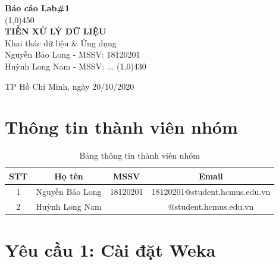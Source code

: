 \documentclass[a4paper, 12pt]{article}
\begin{document}
\begin{titlepage}
    \begin{center}
        \vspace*{1cm}
        \Large\textbf{Báo cáo Lab\#1}\\

        \vfill
        \line(1,0){450}\\[4mm]
        \LARGE\textbf{\MakeUppercase{Tiền xử lý dữ liệu}}\\[3mm]
        \Large{Khai thác dữ liệu \& Ứng dụng}\\[3mm]
        \Large{Nguyễn Bảo Long - MSSV: 18120201}\\
        \Large{Huỳnh Long Nam - MSSV: ...}
        \line(1,0){430}\\
        \vfill

        \vfill
        TP Hồ Chí Minh, ngày 20/10/2020
    \end{center}
\end{titlepage}

\tableofcontents
\thispagestyle{empty}
\clearpage

\section{Thông tin thành viên nhóm}
\begin{table}[H]
    \begin{center}
        \begin{tabular}{|c|c|c|c|}
        \hline
        STT & Họ tên          & MSSV     & Email                         \\ \hline
        1   & Nguyễn Bảo Long & 18120201 & 18120201@student.hcmus.edu.vn \\ \hline
        2   & Huỳnh Long Nam  &          & @student.hcmus.edu.vn         \\ \hline
        \end{tabular}
        \caption{Bảng thông tin thành viên nhóm}
    \end{center}
\end{table}

\section{Yêu cầu 1: Cài đặt Weka}
\end{document}

